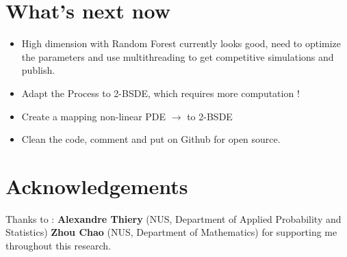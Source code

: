 \documentclass[10pt]{beamer}
\begin{document}
\section{What's next now}

\begin{frame}
	\begin{itemize}
		\item High dimension with Random Forest currently looks good, need to optimize the parameters and use multithreading to get competitive simulations and publish. 
		
		\pause
		\item Adapt the Process to 2-BSDE, which requires more computation !
		\pause
		\item Create a mapping non-linear PDE $\rightarrow$ to 2-BSDE
		\pause
		\item Clean the code, comment and put on Github for open source.  
	\end{itemize}
\end{frame}


\section{Acknowledgements}
\begin{frame}
	

Thanks to : 
\newline
\textbf{Alexandre Thiery }(NUS, Department of Applied Probability and Statistics) 
\newline
 \textbf{Zhou Chao} (NUS, Department of Mathematics) 
 \newline
 for supporting me throughout this research. 

\end{frame}
 
\end{document}
